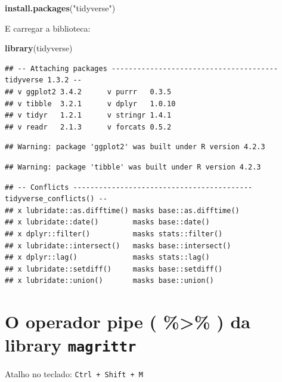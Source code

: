 \documentclass[
]{book}
\newenvironment{Shaded}{\begin{snugshade}}{\end{snugshade}}
\newcommand{\FunctionTok}[1]{\textcolor[rgb]{0.13,0.29,0.53}{\textbf{#1}}}
\newcommand{\NormalTok}[1]{#1}
\newcommand{\StringTok}[1]{\textcolor[rgb]{0.31,0.60,0.02}{#1}}
\begin{document}
\begin{Shaded}
\begin{Highlighting}[]
\FunctionTok{install.packages}\NormalTok{(}\StringTok{"tidyverse"}\NormalTok{)}
\end{Highlighting}
\end{Shaded}

E carregar a biblioteca:

\begin{Shaded}
\begin{Highlighting}[]
\FunctionTok{library}\NormalTok{(tidyverse)}
\end{Highlighting}
\end{Shaded}

\begin{verbatim}
## -- Attaching packages --------------------------------------- tidyverse 1.3.2 --
## v ggplot2 3.4.2      v purrr   0.3.5 
## v tibble  3.2.1      v dplyr   1.0.10
## v tidyr   1.2.1      v stringr 1.4.1 
## v readr   2.1.3      v forcats 0.5.2
\end{verbatim}

\begin{verbatim}
## Warning: package 'ggplot2' was built under R version 4.2.3
\end{verbatim}

\begin{verbatim}
## Warning: package 'tibble' was built under R version 4.2.3
\end{verbatim}

\begin{verbatim}
## -- Conflicts ------------------------------------------ tidyverse_conflicts() --
## x lubridate::as.difftime() masks base::as.difftime()
## x lubridate::date()        masks base::date()
## x dplyr::filter()          masks stats::filter()
## x lubridate::intersect()   masks base::intersect()
## x dplyr::lag()             masks stats::lag()
## x lubridate::setdiff()     masks base::setdiff()
## x lubridate::union()       masks base::union()
\end{verbatim}

\section{\texorpdfstring{O operador pipe ( \%\textgreater\% ) da library \texttt{magrittr}}{O operador pipe ( \%\textgreater\% ) da library magrittr}}\label{o-operador-pipe-da-library-magrittr}

Atalho no teclado: \texttt{Ctrl\ +\ Shift\ +\ M}
\end{document}
